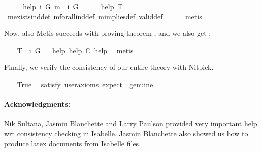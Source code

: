 \begin{isabellebody}
\endisatagproof
{\isafoldproof}%
%
\isadelimproof
\ \isanewline
%
\endisadelimproof
\isanewline
\ \ \isamarkupfalse%
\ help{}{\isacharcolon}\ {\isachardoublequoteopen}{\isacharbrackleft}{\isasymexists}i\ G\ m{\isasymRightarrow}\ {\isasymbox}\ {\isacharparenleft}{\isasymexists}i\ G{\isacharparenright}{\isacharbrackright}{\isachardoublequoteclose}\isanewline
%
\isadelimproof
\ \ \ \ %
\endisadelimproof
%
\isatagproof
{}\isamarkupfalse%
\ help{}\ T{}\ \isamarkupfalse%
\ mexists{\isacharunderscore}ind{\isacharunderscore}def\ mforall{\isacharunderscore}ind{\isacharunderscore}def\ mimplies{\isacharunderscore}def\ valid{\isacharunderscore}def\isanewline
\ \ \ \ \isamarkupfalse%
\ metis%
\endisatagproof
{\isafoldproof}%
%
\isadelimproof
%
\endisadelimproof
%
\begin{isamarkuptext}%
Now, also Metis succeeds with proving theorem , and we also get
 :%
\end{isamarkuptext}%
\isamarkuptrue%
\ \ \isamarkupfalse%
\ T{}{\isacharcolon}\ {\isachardoublequoteopen}{\isacharbrackleft}{\isasymbox}\ {\isacharparenleft}{\isasymexists}i\ G{\isacharparenright}{\isacharbrackright}{\isachardoublequoteclose}%
\isadelimproof
\ %
\endisadelimproof
%
\isatagproof
{}\isamarkupfalse%
\ help{}\ help{}\ C\ help{}\ \isamarkupfalse%
\ metis%
\endisatagproof
{\isafoldproof}%
%
\isadelimproof
%
\endisadelimproof
%
\begin{isamarkuptext}%
Finally, we verify the consistency of our entire theory with Nitpick.%
\end{isamarkuptext}%
\isamarkuptrue%
\ \ \isamarkupfalse%
\ True\ \isamarkupfalse%
\ {\isacharbrackleft}satisfy{\isacharcomma}\ user{\isacharunderscore}axioms{\isacharcomma}\ expect\ {\isacharequal}\ genuine{\isacharbrackright}%
\isadelimproof
\ %
\endisadelimproof
%
\isatagproof
{}\isamarkupfalse%
%
\endisatagproof
{\isafoldproof}%
%
\isadelimproof
%
\endisadelimproof
%
\begin{isamarkuptext}%
\paragraph{Acknowledgments:} Nik Sultana, Jasmin Blanchette and Larry Paulson provided very important 
 help wrt consistency checking in Isabelle. Jasmin Blanchette also showed us how to produce latex documents from Isabelle files.%
\end{isamarkuptext}%
\isamarkuptrue%
%
\isadelimtheory
%
\endisadelimtheory
%
\isatagtheory
%
\endisatagtheory
{\isafoldtheory}%
%
\isadelimtheory
%
\endisadelimtheory
\ \end{isabellebody}%
